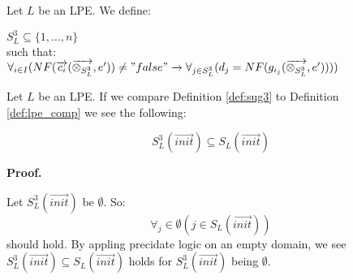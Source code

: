 \documentclass[a4paper,10pt]{article}
\theoremstyle{plain}
\theoremstyle{definition}
\newcommand{\ovr}{\overrightarrow}
\newcommand{\tb}{\textbf}
\begin{document}
\begin{defn} \label{def:sug3} Let $L$ be an LPE. We define:

\begin{flushleft}
$ S_L^3 \subseteq \lbrace 1, \ldots, n \rbrace $ \\

such that:\\

$\forall_{i \in I} (NF( \ovr{c_i} ( \ovr{\otimes_{S_L^3}}, e' ) ) \not= "false" \rightarrow \forall_{j \in S_L^3}(d_j =  NF( g_{i_j}(\ovr{\otimes_{S_L^3}}, e' )))) $
\end{flushleft}
Let $L$ be an LPE. If we compare Definition \ref{def:sug3} to Definition \ref{def:lpe_comp} we see the following:
\begin{lem} \label{lem:sub}
$$S_L^3(\ovr{init}) \subseteq S_L(\ovr{init}) $$
\end{lem} 
\begin{flushleft}
\tb{Proof.}
\end{flushleft}
Let $S_L^3(\ovr{init})$ be $\emptyset$. So: $$\forall_j \in \emptyset ( j \in S_L(\ovr{init}))$$ should hold. By appling precidate logic on an empty domain, we see $S_L^3(\ovr{init}) \subseteq S_L(\ovr{init}) $ holds for $S_L^3(\ovr{init})$ being $\emptyset$. \\


\end{defn}
\end{document}
